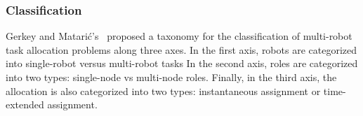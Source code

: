 %
%	
%	
%	





%
%	
%	
%	
%	  


\subsubsection{\textbf{Classification}} Gerkey and Matarić’s~\cite{} proposed a taxonomy for the classification of multi-robot task allocation problems along three axes. In the first axis, robots are categorized into single-robot versus multi-robot tasks%
In the second axis, roles are categorized into two types: single-node vs multi-node roles. Finally, in the third axis, the allocation is also categorized into two types: instantaneous assignment or time-extended assignment.

